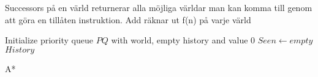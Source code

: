 
Successors på en värld returnerar alla möjliga världar man kan komma till genom
att göra en tillåten instruktion. Add räknar ut f(n) på varje värld
\begin{algorithm}[h!]
 \SetAlgoLined
 Initialize priority queue $PQ$ with world, empty history and value 0\;
 $Seen \leftarrow empty$\;
 \Return $History$
 \caption{A*}
 \label{algorithm:astar}
\end{algorithm}
